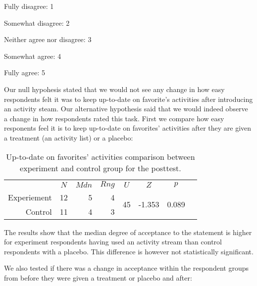 \begin{items}
  \item Fully disagree: 1
  \item Somewhat disagree: 2
  \item Neither agree nor disagree: 3
  \item Somewhat agree: 4
  \item Fully agree: 5
\end{items}

Our null hypohesis stated that we would not see any change in how easy
respondents felt it was to keep up-to-date on favorite's activities
after introducing an activity steam. Our alternative hypothesis said that we
would indeed observe a change in how respondents rated this task.
First we compare how easy responents feel it is to keep up-to-date on
favorites' activities after they are given a treatment (an activity list)
or a placebo:

\begin{table}[!h]
  \begin{tabular}{rrrrrrrr}

    &
    \multicolumn{1}{c}{$N$} &
    \multicolumn{1}{c}{$Mdn$} &
    \multicolumn{1}{c}{$Rng$} &
    \multicolumn{1}{c}{$U$} &
    \multicolumn{1}{c}{$Z$} &
    \multicolumn{1}{c}{$p$} \\

    \cmidrule(lr){2-7}

    Experiement &
    12 &
    5 &
    4 &
    \multirow{2}{*}{45} &
    \multirow{2}{*}{-1.353} &
    \multirow{2}{*}{0.089}\\

    Control &
    11 &
    4 &
    3 &
    &
    \\

  \end{tabular}
  \caption[Up-to-date on Favorites' Activities, Between Groups]{%
    Up-to-date on favorites' activities comparison between
    experiment and control group for the posttest.
  }
\end{table}

The results show that the median degree of acceptance to the statement
is higher for experiment respondents having used an activity stream than
control respondents with a placebo. This difference is however
not statistically significant.

We also tested if there was a change in acceptance within the respondent
groups from before they were given a treatment or placebo and after:


